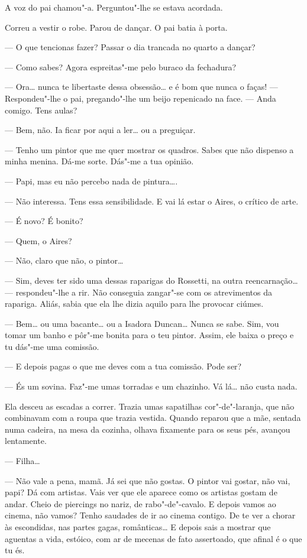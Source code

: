 A voz do pai chamou"-a. Perguntou"-lhe se estava acordada.

Correu a vestir o robe. Parou de dançar. O pai batia à porta.

--- O que tencionas fazer? Passar o dia trancada no quarto a dançar?

--- Como sabes? Agora espreitas"-me pelo buraco da fechadura?

--- Ora\ldots{} nunca te libertaste dessa obsessão\ldots{} e é bom que nunca o faças!
--- Respondeu"-lhe o pai, pregando"-lhe um beijo repenicado na face. --- Anda
comigo. Tens aulas?

--- Bem, não. Ia ficar por aqui a ler\ldots{} ou a preguiçar.

--- Tenho um pintor que me quer mostrar os quadros. Sabes que não dispenso
a minha menina. Dá-me sorte. Dás"-me a tua opinião.

--- Papi, mas eu não percebo nada de pintura\ldots{}.

--- Não interessa. Tens essa sensibilidade. E vai lá estar o Aires, o
crítico de arte.

--- É novo? É bonito?

--- Quem, o Aires?

--- Não, claro que não, o pintor\ldots{}

--- Sim, deves ter sido uma dessas raparigas do Rossetti, na outra
reencarnação\ldots{} --- respondeu"-lhe a rir. Não conseguia zangar"-se com os
atrevimentos da rapariga. Aliás, sabia que ela lhe dizia aquilo para lhe
provocar ciúmes.

--- Bem\ldots{} ou uma bacante\ldots{} ou a Isadora Duncan\ldots{} Nunca se sabe. Sim,
vou tomar um banho e pôr"-me bonita para o teu pintor. Assim, ele baixa o
preço e tu dás"-me uma comissão.

--- E depois pagas o que me deves com a tua comissão. Pode ser?

--- És um sovina. Faz"-me umas torradas e um chazinho. Vá lá\ldots{} não custa
nada.

Ela desceu as escadas a correr. Trazia umas sapatilhas cor"-de"-laranja,
que não combinavam com a roupa que trazia vestida. Quando reparou que a
mãe, sentada numa cadeira, na mesa da cozinha, olhava fixamente para os
seus pés, avançou lentamente.

--- Filha\ldots{}

--- Não vale a pena, mamã. Já sei que não gostas. O pintor vai gostar, não
vai, papi? Dá com artistas. Vais ver que ele aparece como os artistas
gostam de andar. Cheio de piercings no nariz, de rabo"-de"-cavalo. E
depois vamos ao cinema, não vamos? Tenho saudades de ir ao cinema
contigo. De te ver a chorar às escondidas, nas partes gagas,
românticas\ldots{} E depois sais a mostrar que aguentas a vida, estóico, com
ar de mecenas de fato assertoado, que afinal é o que tu és.

